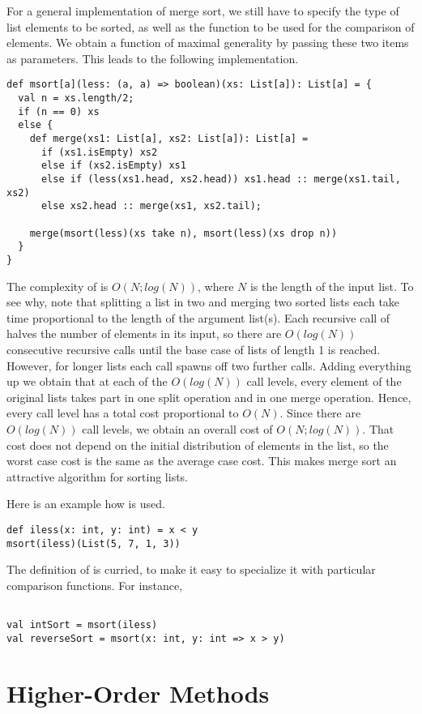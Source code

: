 \documentclass[11pt]{book}
\begin{document}
For a general implementation of merge sort, we still have to specify
the type of list elements to be sorted, as well as the function to be
used for the comparison of elements. We obtain a function of maximal
generality by passing these two items as parameters. This leads to the
following implementation.
\begin{verbatim}
def msort[a](less: (a, a) => boolean)(xs: List[a]): List[a] = {
  val n = xs.length/2;
  if (n == 0) xs
  else {
    def merge(xs1: List[a], xs2: List[a]): List[a] = 
      if (xs1.isEmpty) xs2
      else if (xs2.isEmpty) xs1
      else if (less(xs1.head, xs2.head)) xs1.head :: merge(xs1.tail, xs2)
      else xs2.head :: merge(xs1, xs2.tail);

    merge(msort(less)(xs take n), msort(less)(xs drop n))
  }
}
\end{verbatim}
The complexity of \verb@msort@ is $O(N;log(N))$, where $N$ is the
length of the input list. To see why, note that splitting a list in
two and merging two sorted lists each take time proportional to the
length of the argument list(s). Each recursive call of \verb@msort@
halves the number of elements in its input, so there are $O(log(N))$
consecutive recursive calls until the base case of lists of length 1
is reached.  However, for longer lists each call spawns off two
further calls. Adding everything up we obtain that at each of the
$O(log(N))$ call levels, every element of the original lists takes
part in one split operation and in one merge operation. Hence, every
call level has a total cost proportional to $O(N)$. Since there are
$O(log(N))$ call levels, we obtain an overall cost of
$O(N;log(N))$. That cost does not depend on the initial distribution
of elements in the list, so the worst case cost is the same as the
average case cost. This makes merge sort an attractive algorithm for
sorting lists.

Here is an example how \verb@msort@ is used.
\begin{verbatim}
def iless(x: int, y: int) = x < y
msort(iless)(List(5, 7, 1, 3))
\end{verbatim}
The definition of \verb@msort@ is curried, to make it easy to specialize it with particular
comparison functions. For instance,
\begin{verbatim}

val intSort = msort(iless)
val reverseSort = msort(x: int, y: int => x > y)
\end{verbatim}

\section*{Higher-Order Methods}
\end{document}
